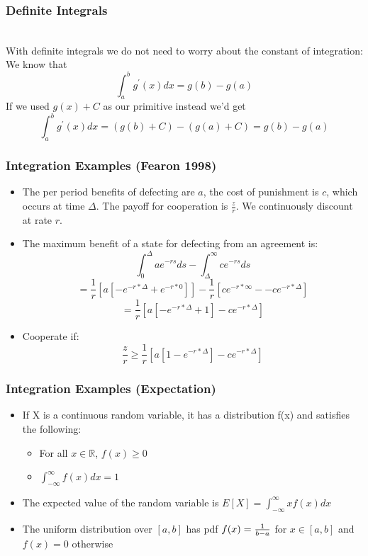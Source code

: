 \documentclass{beamer}
\numberwithin{equation}{section}
\begin{document}
\begin{frame}
\frametitle{Definite Integrals}

\ \\With definite integrals we do not need to worry about the constant of integration: \pause We know that $$\int_a^b g^\prime(x) dx=g(b)-g(a)$$ \pause If we used $g(x)+C$ as our primitive instead we'd get \pause $$\int_a^b g^\prime(x) dx=(g(b) +C)-(g(a)+C)=g(b)-g(a)$$


\end{frame}


\begin{frame}
\frametitle{Integration Examples (Fearon 1998)}

\begin{itemize}
\item  The per period benefits of defecting are $a$, the cost of punishment is $c$, which occurs at time $\Delta$.  The payoff for cooperation is $\frac{z}{r}$. We continuously discount at rate $r$.
\item The maximum benefit of a state for defecting from an agreement is:
$$\int_0^\Delta a e^{-rs} ds - \int_\Delta^{\infty} c  e^{-rs}ds$$\pause
$$=\frac{1}{r}[a[-e^{-r*\Delta}+e^{-r*0}]]-\frac{1}{r}[ce^{-r*\infty} - -ce^{-r*\Delta}]$$
$$=\frac{1}{r}[a[-e^{-r*\Delta}+1]-ce^{-r*\Delta}]$$\pause
\item Cooperate if:
$$\frac{z}{r}\geq \frac{1}{r}[a[1-e^{-r*\Delta}]-ce^{-r*\Delta}]$$
\end{itemize}

\end{frame}



\begin{frame}
\frametitle{Integration Examples (Expectation)}

\begin{itemize}
\item  If X is a continuous random variable, it has a distribution f(x) and satisfies the following:

\begin{itemize}
\item For all $x\in \mathbb{R}$, $f(x)\geq 0$
\item $\int_{-\infty}^{\infty}f(x)dx =1$
\end{itemize}

\item The expected value of the random variable is $E[X]=\int_{-\infty}^{\infty}x f(x) dx$

\item The uniform distribution over $[a, b]$ has pdf $f(x)={1\over{b-a}}$ for $x\in [a,b]$ and $f(x)=0$ otherwise


\end{itemize}

\end{frame}
\end{document}

